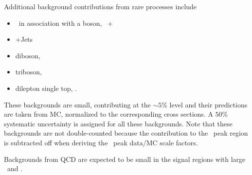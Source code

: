Additional background contributions from rare processes include
\begin{itemize}
\item  \ttbar\ in association with a boson, \ttbar\ + \W\/\dy\ \\
\item \dy+Jets \\
\item diboson, \vv\ \\
\item triboson, \vvv\ \\
\item dilepton single top, \tw. \\
\end{itemize}
These backgrounds are small, contributing at the $\sim 5\%$ level and their predictions are taken 
from MC, normalized to the corresponding cross sections. A $50\%$ systematic uncertainty is 
assigned for all these backgrounds.
Note that these backgrounds are not double-counted because the contribution to the \mt\ peak region
is subtracted off when deriving the \mt\ peak data/MC scale factors. %


Backgrounds from QCD are expected to be small in the signal regions with large \mt\ and \met.
